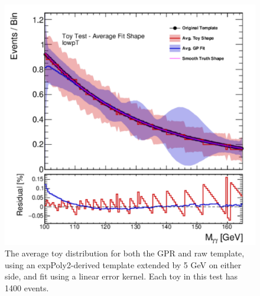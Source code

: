 \begin{figure} 
\begin{center}
  \includegraphics[width=\textwidth]{figures/background/gpr/validation/linear/ToyTest_AvgFitShape_lowpT_1400_noSig}   
\caption{The average toy distribution for both the GPR and raw template, using an expPoly2-derived template extended by 5 GeV on either side, and fit using a linear error kernel. Each toy in this test has 1400 events.}
\label{fig:linearkernel_lowpt_1400_noSig}
\end{center}
\end{figure}

